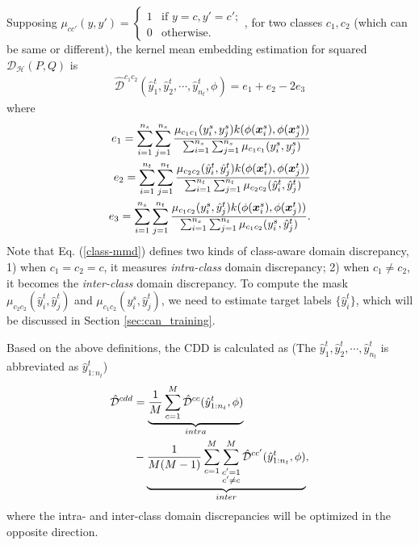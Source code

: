 \documentclass[10pt,twocolumn,letterpaper]{article}
\begin{document}
Supposing 
$\mu_{cc'}(y, y') = \left\{ \begin{array}{ll}
         1 & \mbox{if $y=c, y'=c'$};\\
         0 & \mbox{otherwise}.\end{array} \right.
         $, 
for two classes $c_1, c_2$ (which can be same or different),
the kernel mean embedding estimation for squared $\mathcal{D}_{\mathcal{H}}(P, Q)$ is 
\begin{align}
\hat{\mathcal{D}}^{c_1c_2}(\hat{y}^t_1, \hat{y}^t_2, \cdots, \hat{y}^t_{n_t}, \phi) = e_1 + e_2 - 2e_3
\label{class-mmd}
\end{align}
where
\begin{align}
e_1 = \sum_{i=1}^{n_s}\sum_{j=1}^{n_s}{\frac{\mu_{c_1c_1}(y^s_i, y^s_j)k(\phi(\boldsymbol{x}^{s}_i), \phi(\boldsymbol{x}^{s}_j))}
{\sum_{i=1}^{n_s}\sum_{j=1}^{n_s}{\mu_{{c_1c_1}}(y^s_i, y^s_j)}}} \nonumber
\\
e_2 = \sum_{i=1}^{n_t}\sum_{j=1}^{n_t}{\frac{\mu_{c_2c_2}(\hat{y}^t_i, \hat{y}^t_j)k(\phi(\boldsymbol{x}^{t}_i), \phi(\boldsymbol{x}^{t}_j))}
{\sum_{i=1}^{n_t}\sum_{j=1}^{n_t}{\mu_{c_2c_2}(\hat{y}^t_i, \hat{y}^t_j)}}} \nonumber
\\
e_3 = \sum_{i=1}^{n_s}\sum_{j=1}^{n_t}{\frac{\mu_{c_1c_2}(y^s_i, \hat{y}^t_j)k(\phi(\boldsymbol{x}^{s}_i), \phi(\boldsymbol{x}^{t}_j))}
{\sum_{i=1}^{n_s}\sum_{j=1}^{n_t}{\mu_{c_1c_2}(y^s_i, \hat{y}^t_j)}}}.
\end{align}
Note that Eq. (\ref{class-mmd}) defines two kinds of class-aware domain discrepancy,
1) when $c_1 = c_2 = c$, it measures \textit{intra-class} domain discrepancy; 
2) when $c_1 \neq c_2$, it becomes the \textit{inter-class} domain discrepancy.
To compute the mask $\mu_{c_2c_2}(\hat{y}_i^t, \hat{y}_j^t)$ and
$\mu_{c_1c_2}(y_i^s, \hat{y}_j^t)$,
we need to estimate target labels $\{\hat{y}^t_i\}$, 
which will be discussed in Section \ref{sec:can_training}.

Based on the above definitions,
the CDD is calculated as 
(The $\hat{y}^t_1, \hat{y}^t_2, \cdots, \hat{y}^t_{n_t}$ 
is abbreviated as $\hat{y}^t_{1:n_t}$)
\vspace{-2mm}
\begin{align}
\label{cdd}
\hat{\mathcal{D}}^{cdd} &= \underbrace{\frac{1}{M}\sum_{c=1}^M \hat{\mathcal{D}}^{c c}(\hat{y}^t_{1:n_t}, \phi)}_{intra} \nonumber \\
& - \underbrace{\frac{1}{M(M-1)}\sum_{c=1}^M \sum_{\substack{c{'}=1 \\ c{'}\neq c}}^M \hat{\mathcal{D}}^{cc'}(\hat{y}^t_{1:n_t}, \phi)}_{inter},
\end{align}
where the intra- and inter-class domain discrepancies will be optimized in the opposite direction.
\end{document}
